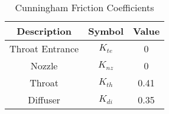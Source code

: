 \begin{table}[h]
\centering
\begin{tabular}{|c|c|c|}
\hline
Description & Symbol & Value \\
\hline
Throat Entrance & $K_{te}$ & 0 \\
Nozzle & $K_{nz}$ & 0 \\
Throat & $K_{th}$ & 0.41 \\
Diffuser & $K_{di}$ & 0.35 \\
\hline
\end{tabular}
\caption{Cunningham Friction Coefficients}
\label{tab:fric_coeff_cunn}
\end{table}
